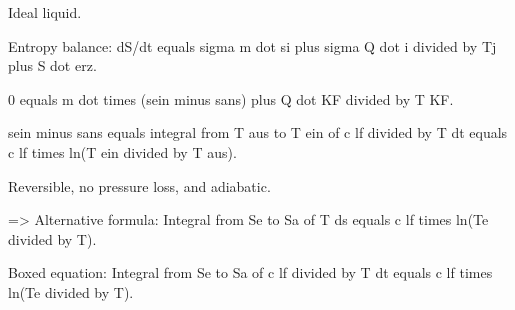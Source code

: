 Ideal liquid.  

Entropy balance:  
dS/dt equals sigma m dot si plus sigma Q dot i divided by Tj plus S dot erz.  

0 equals m dot times (sein minus sans) plus Q dot KF divided by T KF.  

sein minus sans equals integral from T aus to T ein of c lf divided by T dt equals c lf times ln(T ein divided by T aus).  

Reversible, no pressure loss, and adiabatic.  

=> Alternative formula:  
Integral from Se to Sa of T ds equals c lf times ln(Te divided by T).  

Boxed equation:  
Integral from Se to Sa of c lf divided by T dt equals c lf times ln(Te divided by T).